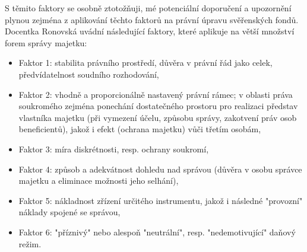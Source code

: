 \documentclass{article}
\begin{document}
S těmito faktory se osobně ztotožňuji, mé potenciální doporučení a upozornění plynou zejména z aplikování těchto faktorů na právní úpravu svěřenských fondů.\\

Docentka Ronovská uvádní následující faktory, které aplikuje na větší množství forem správy majetku:

\begin{itemize}
	\item Faktor 1: stabilita právního prostředí, důvěra v právní řád jako celek, předvídatelnost soudního rozhodování,
	\item Faktor 2: vhodně a proporcionálně nastavený právní rámec; v oblasti práva soukromého zejména ponechání dostatečného prostoru pro realizaci představ vlastníka majetku (při vymezení účelu, způsobu správy, zakotvení práv osob beneficientů), jakož i efekt (ochrana majetku) vůči třetím osobám,
	\item Faktor 3: míra diskrétnosti, resp. ochrany soukromí,
	\item Faktor 4: způsob a adekvátnost dohledu nad správou (důvěra v osobu správce majetku a eliminace možnosti jeho selhání),
	\item Faktor 5: nákladnost zřízení určitého instrumentu, jakož i následné "provozní" náklady spojené se správou,
	\item Faktor 6: "příznivý" nebo alespoň "neutrální", resp. "nedemotivující" daňový režim.
\end{itemize}



\newpage
\thispagestyle{smallertextinheader}
\end{document}
